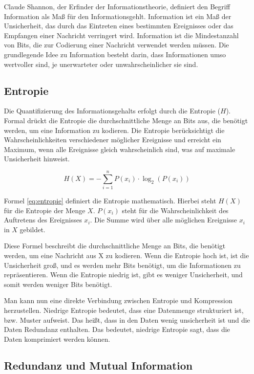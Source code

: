 \documentclass[conference]{IEEEtran}
\begin{document}
Claude Shannon, der Erfinder der Informationstheorie, definiert den Begriff Information
als Maß für den Informationsgehlt.
Information ist ein Maß der Unsicherheit, das durch das Eintreten eines bestimmten
Ereignisses oder das Empfangen einer Nachricht verringert wird. \cite{shannon}
Information ist die Mindestanzahl von Bits, die zur Codierung einer Nachricht verwendet
werden müssen. \cite{shannon2}
Die grundlegende Idee zu Information besteht darin, dass Informationen umso wertvoller sind,
je unerwarteter oder unwahrscheinlicher sie sind.

\subsection{Entropie}

Die Quantifizierung des Informationsgehalts erfolgt durch die Entropie ($H$).
Formal drückt die Entropie die durchschnittliche Menge an Bits aus,
die benötigt werden, um eine Information zu kodieren. \cite{shannon}
Die Entropie berücksichtigt die Wahrscheinlichkeiten verschiedener möglicher
Ereignisse und erreicht ein Maximum, wenn alle Ereignisse gleich wahrscheinlich sind,
was auf maximale Unsicherheit hinweist.

\begin{equation}
  \label{eq:entropie}
  H(X) = -\sum_{i=1}^{n} P(x_i) \cdot \log_{2}(P(x_i))
\end{equation}

Formel \ref{eq:entropie} definiert die Entropie mathematisch.
Hierbei steht $H(X)$ für die Entropie der Menge $X$.
$P(x_i)$ steht für die Wahrscheinlichkeit des
Auftretens des Ereignisses $x_i$.
Die Summe wird über alle möglichen Ereignisse
$x_i$ in $X$ gebildet.

Diese Formel beschreibt die durchschnittliche Menge an Bits, die benötigt werden,
um eine Nachricht aus X zu kodieren.
Wenn die Entropie hoch ist, ist die Unsicherheit groß, und es werden mehr Bits
benötigt, um die Informationen zu repräsentieren.
Wenn die Entropie niedrig ist, gibt es weniger Unsicherheit, und somit werden
weniger Bits benötigt.

Man kann nun eine direkte Verbindung zwischen Entropie und Kompression herzustellen.
Niedrige Entropie bedeutet, dass eine Datenmenge strukturiert ist, bzw. Muster aufweist.
Das heißt, dass in den Daten wenig unsicherheit ist und die Daten Redundanz enthalten.
Das bedeutet, niedrige Entropie sagt, dass die Daten komprimiert werden können.


\subsection{Redundanz und Mutual Information}
\end{document}
